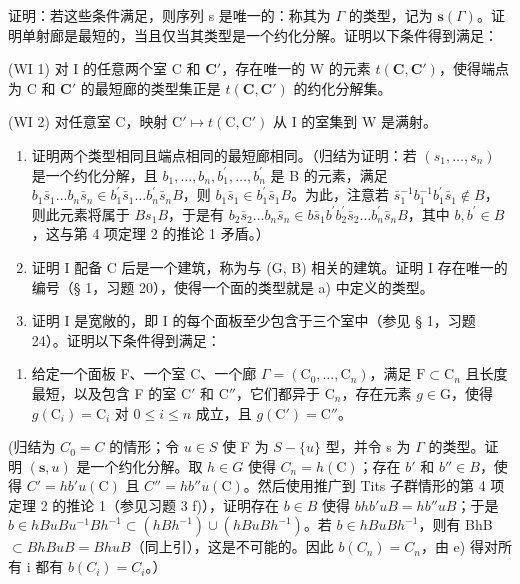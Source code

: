 证明：若这些条件满足，则序列 s 是唯一的：称其为 \(\Gamma\) 的类型，记为 \(\mathbf{s}(\Gamma)\)。证明单射廊是最短的，当且仅当其类型是一个约化分解。证明以下条件得到满足：

(WI 1) 对 I 的任意两个室 C 和 \(\mathbf{C}'\)，存在唯一的 W 的元素 \(t(\mathbf{C},\mathbf{C}')\)，使得端点为 C 和 \(\mathbf{C}'\) 的最短廊的类型集正是 \(t(\mathbf{C},\mathbf{C}')\) 的约化分解集。

(WI 2) 对任意室 C，映射 \(\mathrm{C}' \mapsto t(\mathrm{C}, \mathrm{C}')\) 从 I 的室集到 W 是满射。

\begin{enumerate}
\def\labelenumi{\alph{enumi})}
\setcounter{enumi}{4}
\item
  证明两个类型相同且端点相同的最短廊相同。（归结为证明：若 \((s_{1},\ldots,s_{n})\) 是一个约化分解，且 \(b_{1},\ldots,b_{n},b_{1}^{\prime},\ldots,b_{n}^{\prime}\) 是 B 的元素，满足 \(b_{1}\bar{s}_{1}\ldots b_{n}\bar{s}_{n}\in b_{1}^{\prime}\bar{s}_{1}\ldots b_{n}^{\prime}\bar{s}_{n}B\)，则 \(b_{1}\bar{s}_{1}\in b_{1}^{\prime}\bar{s}_{1}B\)。为此，注意若 \(\bar{s}_{1}^{-1}b_{1}^{-1}b_{1}^{\prime}\bar{s}_{1}\notin B\)，则此元素将属于 \(Bs_{1}B\)，于是有 \(b_{2}\bar{s}_{2}\ldots b_{n}\bar{s}_{n}\in b\bar{s}_{1}b^{\prime}b_{2}^{\prime}\bar{s}_{2}\ldots b_{n}^{\prime}\bar{s}_{n}B\)，其中 \(b,b^{\prime}\in B\)，这与第 4 项定理 2 的推论 1 矛盾。）
\item
  证明 I 配备 C 后是一个建筑，称为与 (G, B) 相关的建筑。证明 I 存在唯一的编号（§ 1，习题 20），使得一个面的类型就是 a) 中定义的类型。
\item
  证明 I 是宽敞的，即 I 的每个面板至少包含于三个室中（参见 § 1，习题 24）。证明以下条件得到满足：
\end{enumerate}

\begin{enumerate}
\def\labelenumi{(\Alph{enumi})}
\setcounter{enumi}{6}
\tightlist
\item
  给定一个面板 F、一个室 C、一个廊 \(\Gamma = (\mathrm{C}_0, \ldots, \mathrm{C}_n)\)，满足 \(\mathrm{F} \subset \mathrm{C}_n\) 且长度最短，以及包含 F 的室 \(\mathrm{C}'\) 和 \(\mathrm{C}''\)，它们都异于 \(\mathrm{C}_n\)，存在元素 \(g \in \mathrm{G}\)，使得 \(g(\mathrm{C}_i) = \mathrm{C}_i\) 对 \(0 \leqslant i \leqslant n\) 成立，且 \(g(\mathrm{C}') = \mathrm{C}''\)。
\end{enumerate}

(归结为 \(C_{0} = C\) 的情形；令 \(u \in S\) 使 F 为 \(S - \{u\}\) 型，并令 s 为 \(\Gamma\) 的类型。证明 \((\mathbf{s}, u)\) 是一个约化分解。取 \(h \in G\) 使得 \(C_{n} = h(\mathrm{C})\)；存在 \(b'\) 和 \(b'' \in B\)，使得 \(C' = hb'u(\mathrm{C})\) 且 \(C'' = hb''u(\mathrm{C})\)。然后使用推广到 Tits 子群情形的第 4 项定理 2 的推论 1（参见习题 3 f)），证明存在 \(b \in B\) 使得 \(bhb'uB = hb''uB\)；于是 \(b \in hBuBu^{-1}Bh^{-1} \subset (hBh^{-1}) \cup (hBuBh^{-1})\)。若 \(b \in hBuBh^{-1}\)，则有 BhB \(\subset BhBuB = BhuB\)（同上引），这是不可能的。因此 \(b(C_{n}) = C_{n}\)，由 e) 得对所有 i 都有 \(b(C_{i}) = C_{i}\)。）

